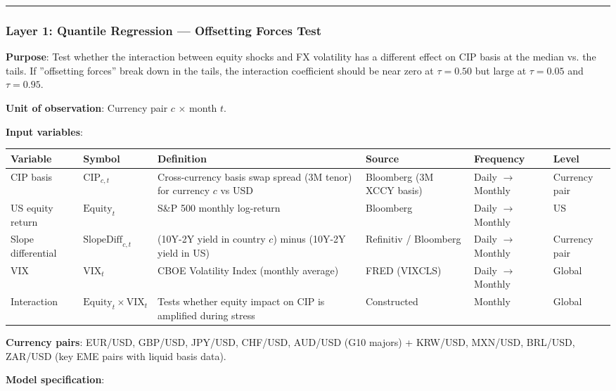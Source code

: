 \documentclass[11pt,a4paper]{article}
\begin{document}
\bigskip\noindent\rule{\textwidth}{0.4pt}\bigskip


\subsubsection{Layer 1: Quantile Regression --- Offsetting Forces Test}

\textbf{Purpose}: Test whether the interaction between equity shocks and FX volatility has a different effect on CIP basis at the median vs. the tails. If ''offsetting forces'' break down in the tails, the interaction coefficient should be near zero at $\tau = 0.50$ but large at $\tau = 0.05$ and $\tau = 0.95$.

\textbf{Unit of observation}: Currency pair $c$ $\times$ month $t$.

\textbf{Input variables}:


{\small
\begin{longtable}{|p{}|p{}|p{}|p{}|p{}|p{}|}
\hline
\textbf{Variable} & \textbf{Symbol} & \textbf{Definition} & \textbf{Source} & \textbf{Frequency} & \textbf{Level} \\
\hline
\endhead
CIP basis & $\text{CIP}_{c,t}$ & Cross-currency basis swap spread (3M tenor) for currency $c$ vs USD & Bloomberg (3M XCCY basis) & Daily $\rightarrow$ Monthly & Currency pair \\
\hline
US equity return & $\text{Equity}_t$ & S\&P 500 monthly log-return & Bloomberg & Daily $\rightarrow$ Monthly & US \\
\hline
Slope differential & $\text{SlopeDiff}_{c,t}$ & (10Y-2Y yield in country $c$) minus (10Y-2Y yield in US) & Refinitiv / Bloomberg & Daily $\rightarrow$ Monthly & Currency pair \\
\hline
VIX & $\text{VIX}_t$ & CBOE Volatility Index (monthly average) & FRED (VIXCLS) & Daily $\rightarrow$ Monthly & Global \\
\hline
Interaction & $\text{Equity}_t \times \text{VIX}_t$ & Tests whether equity impact on CIP is amplified during stress & Constructed & Monthly & Global \\
\hline
\end{longtable}
}

\textbf{Currency pairs}: EUR/USD, GBP/USD, JPY/USD, CHF/USD, AUD/USD (G10 majors) + KRW/USD, MXN/USD, BRL/USD, ZAR/USD (key EME pairs with liquid basis data).

\textbf{Model specification}:
\end{document}
